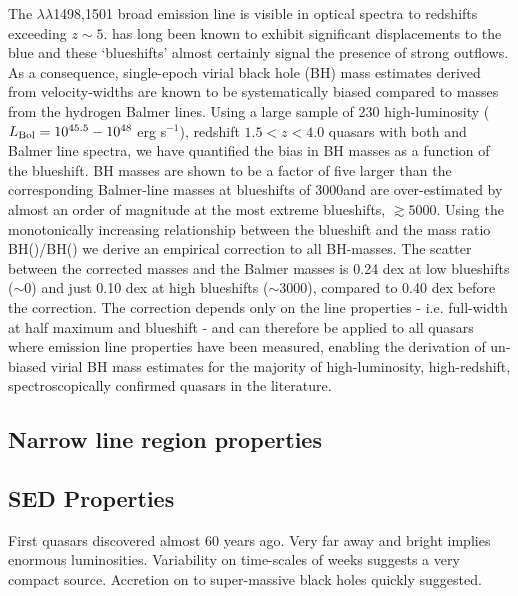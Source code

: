 The $\lambda\lambda$1498,1501 broad emission line is visible in optical spectra to redshifts exceeding $z\sim5$. 
 has long been known to exhibit significant displacements to the blue and these `blueshifts' almost certainly signal the presence of strong outflows.
As a consequence, single-epoch virial black hole (BH) mass estimates derived from  velocity-widths are known to be systematically biased compared to masses from the hydrogen Balmer lines. 
Using a large sample of 230 high-luminosity ($L_{\rm Bol} = 10^{45.5}-10^{48}$ erg s$^{-1}$), redshift $1.5 < z < 4.0$ quasars with both  and Balmer line spectra, we have quantified the bias in  BH masses as a function of the  blueshift. 
 BH masses are shown to be a factor of five larger than the corresponding Balmer-line masses at  blueshifts of 3000\kms and are over-estimated by almost an order of magnitude at the most extreme blueshifts, $\gtrsim 5000$\kms.
Using the monotonically increasing relationship between the  blueshift and the mass ratio BH()/BH(\hans) we derive an empirical correction to all  BH-masses.
The scatter between the corrected  masses and the Balmer masses is 0.24 dex at low  blueshifts ($\sim$0\kms) and just 0.10 dex at high blueshifts ($\sim$3000\kms), compared to 0.40 dex before the correction. 
The correction depends only on the  line properties - i.e. full-width at half maximum and blueshift - and can therefore be applied to all quasars where  emission line properties have been measured, enabling the derivation of un-biased virial BH mass estimates for the majority of high-luminosity, high-redshift, spectroscopically confirmed quasars in the literature.

\subsection{Narrow line region properties}

\subsection{SED Properties}



First quasars discovered almost 60 years ago.
Very far away and bright implies enormous luminosities. 
Variability on time-scales of weeks suggests a very compact source. 
Accretion on to super-massive black holes quickly suggested. 

